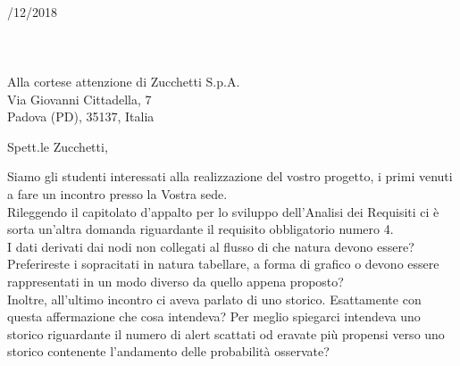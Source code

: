 \documentclass[11pt, a4paper]{letter} %
\begin{document}

\begin{letter}{
	\-\\/12/2018
	\-\\\-\\\-\\\-\\
	Alla cortese attenzione di Zucchetti S.p.A. \\
	Via Giovanni Cittadella, 7\\
	Padova (PD), 35137, Italia
}


\opening{Spett.le Zucchetti,}

Siamo gli studenti interessati alla realizzazione del vostro progetto, i primi venuti a fare un incontro
presso la Vostra sede.\\
Rileggendo il capitolato d'appalto per lo sviluppo dell'Analisi dei Requisiti ci è sorta un'altra domanda riguardante il requisito obbligatorio numero 4.\\
I dati derivati dai nodi non collegati al flusso di che natura devono essere? Preferireste i sopracitati in natura tabellare, a forma di grafico o devono essere rappresentati in un modo diverso da quello appena proposto?\\
Inoltre, all'ultimo incontro ci aveva parlato di uno storico. Esattamente con questa affermazione che cosa intendeva? Per meglio spiegarci intendeva uno storico riguardante il numero di alert scattati od eravate più propensi verso uno storico contenente l'andamento delle probabilità osservate?




\end{letter}
\end{document}
